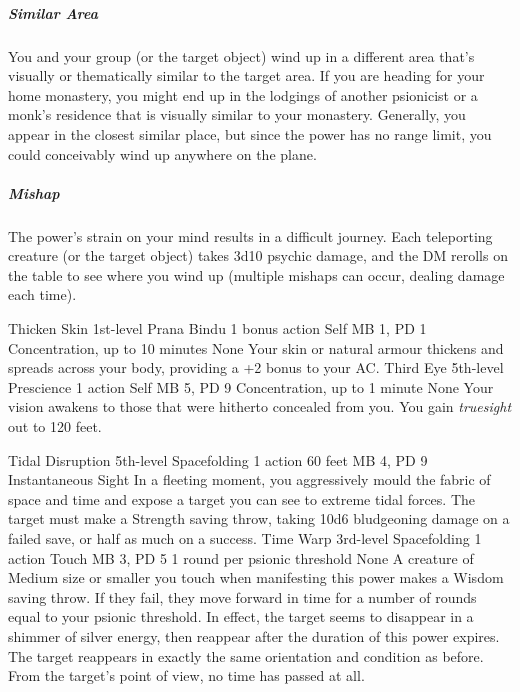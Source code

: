\subparagraph{Similar Area}
  You and your group (or the target object) wind up in a different area
  that's visually or thematically similar to the target area.
  If you are heading for your home monastery,
  you might end up in the lodgings of another psionicist
  or a monk's residence that is visually similar to your monastery.
  Generally, you appear in the closest similar place,
  but since the power has no range limit,
  you could conceivably wind up anywhere on the plane.

\subparagraph{Mishap}
  The power's strain on your mind results in a difficult journey.
  Each teleporting creature (or the target object) takes 3d10 psychic damage,
  and the DM rerolls on the table to see where you wind up
  (multiple mishaps can occur, dealing damage each time).

\DndPowerHeader%
    {Thicken Skin\label{pwr:thicken_skin}}
    {1st-level Prana Bindu}
    {1 bonus action}
    {Self}
    {MB 1, PD 1}
    {Concentration, up to 10 minutes}
    {None}
Your skin or natural armour thickens and spreads
across your body, providing a +2 bonus to your AC.
\DndPowerHeader%
    {Third Eye\label{pwr:third_eye}}
    {5th-level Prescience}
    {1 action}
    {Self}
    {MB 5, PD 9}
    {Concentration, up to 1 minute}
    {None}
Your vision awakens to those that were hitherto
concealed from you. You gain \emph{truesight} out to 120 feet.

\DndPowerHeader%
    {Tidal Disruption\label{pwr:tidal_disruption}}
    {5th-level Spacefolding}
    {1 action}
    {60 feet}
    {MB 4, PD 9}
    {Instantaneous}
    {Sight}
In a fleeting moment, you aggressively mould the fabric of space and time
and expose a target you can see to extreme tidal forces.
The target must make a Strength saving throw,
taking 10d6 bludgeoning damage on a failed save, or half as much on a success.
\DndPowerHeader%
    {Time Warp\label{pwr:time_warp}}
    {3rd-level Spacefolding}
    {1 action}
    {Touch}
    {MB 3, PD 5}
    {1 round per psionic threshold}
    {None}
A creature of Medium size or smaller you
touch when manifesting this power makes a Wisdom saving throw.
If they fail, they move forward in time for a number of rounds
equal to your psionic threshold. In effect, the target seems
to disappear in a shimmer of silver energy, then reappear
after the duration of this power expires. The target reappears
in exactly the same orientation and condition as before. From
the target's point of view, no time has passed at all.

